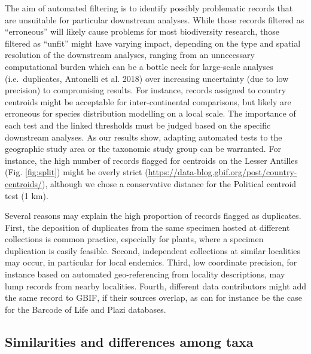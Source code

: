 \documentclass[fleqn,10pt,lineno]{wlpeerj} %
\begin{document}
The aim of automated filtering is to identify possibly problematic records that are unsuitable for particular downstream analyses. While those records filtered as ``erroneous'' will likely cause problems for most biodiversity research, those filtered as ``unfit'' might have varying impact, depending on the type and spatial resolution of the downstream analyses, ranging from an unnecessary computational burden which can be a bottle neck for large-scale analyses (i.e.~duplicates, Antonelli et al. 2018) over increasing uncertainty (due to low precision) to compromising results. For instance, records assigned to country centroids might be acceptable for inter-continental comparisons, but likely are erroneous for species distribution modelling on a local scale. The importance of each test and the linked thresholds must be judged based on the specific downstream analyses. As our results show, adapting automated tests to the geographic study area or the taxonomic study group can be warranted. For instance, the high number of records flagged for centroids on the Lesser Antilles (Fig. \ref{fig:split}) might be overly strict (\url{https://data-blog.gbif.org/post/country-centroids/}), although we chose a conservative distance for the Political centroid test (1 km).

Several reasons may explain the high proportion of records flagged as duplicates. First, the deposition of duplicates from the same specimen hosted at different collections is common practice, especially for plants, where a specimen duplication is easily feasible. Second, independent collections at similar localities may occur, in particular for local endemics. Third, low coordinate precision, for instance based on automated geo-referencing from locality descriptions, may lump records from nearby localities. Fourth, different data contributors might add the same record to GBIF, if their sources overlap, as can for instance be the case for the Barcode of Life and Plazi databases.

\hypertarget{similarities-and-differences-among-taxa}{%
\subsection*{Similarities and differences among taxa}\label{similarities-and-differences-among-taxa}}
\end{document}
